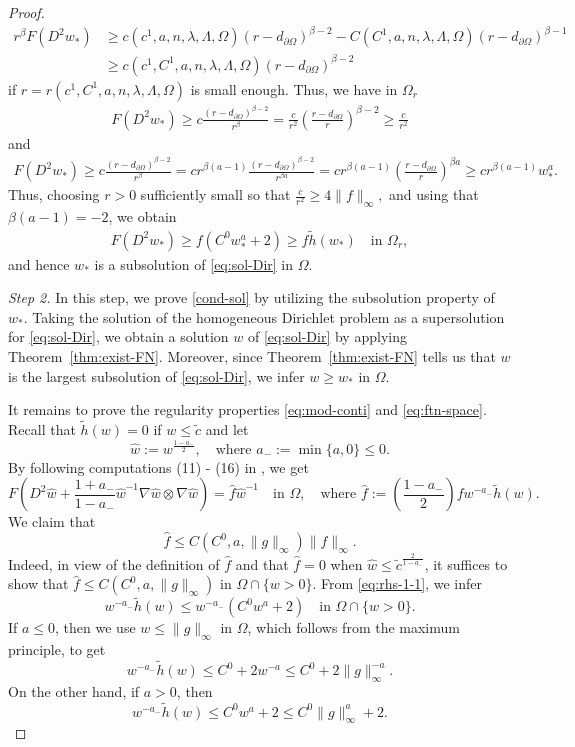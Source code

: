 \documentclass[11pt,oneside,english]{amsart}
\newcommand{\be}{\beta}
\newcommand{\la}{\lambda}
\newcommand{\D}{\nabla}
\numberwithin{equation}{section}
\theoremstyle{plain}
\numberwithin{equation}{section}
\begin{document}
\begin{proof}
\begin{align*}
    r^\be F(D^2w_*)&\ge c(c^1,a,n,\la,\Lambda,\Omega)(r-d_{\partial\Omega})^{\be-2}-C(C^1,a,n,\la,\Lambda,\Omega)(r-d_{\partial\Omega})^{\be-1}\\
    &\ge c(c^1,C^1,a,n,\la,\Lambda,\Omega)(r-d_{\partial\Omega})^{\be-2}
\end{align*}
if $r=r(c^1,C^1,a,n,\la,\Lambda,\Omega)$ is small enough. Thus, we have in $\Omega_r$
\begin{align*}
    F(D^2w_*)\ge c\frac{(r-d_{\partial\Omega})^{\be-2}}{r^\be}=\frac{c}{r^2}\left(\frac{r-d_{\partial\Omega}}{r}\right)^{\be-2}\ge\frac{c}{r^2}
\end{align*}
and 
\begin{align*}
    F(D^2w_*)\ge c\frac{(r-d_{\partial\Omega})^{\be-2}}{r^\be}=cr^{\be(a-1)}\frac{(r-d_{\partial\Omega})^{\be-2}}{r^{\be a}}=cr^{\be(a-1)}\left(\frac{r-d_{\partial\Omega}}r\right)^{\be a}\ge cr^{\be(a-1)}w_*^a.
\end{align*}
Thus, 
choosing $r>0$ sufficiently small so that
$\frac{c}{r^2}\ge 4\|f\|_\infty,$
and using that $\beta(a-1)=-2$, we obtain
\begin{align*}
    F(D^2w_*)\ge f(C^0w_*^a+2)\ge f\tilde h(w_*)\quad\text{in }\Omega_r,
\end{align*} 
and hence  $w_*$ is a subsolution of \eqref{eq:sol-Dir} in $\Omega$.

\medskip\noindent\emph{Step 2.} In this step, we prove \ref{cond-sol} by utilizing the subsolution property of $w_*$. Taking the solution of the homogeneous Dirichlet problem as a supersolution for \eqref{eq:sol-Dir}, we obtain a solution $w$ of \eqref{eq:sol-Dir} by applying Theorem~\ref{thm:exist-FN}. Moreover, since Theorem~\ref{thm:exist-FN} tells us that $w$ is the largest subsolution of \eqref{eq:sol-Dir}, we infer $w\ge  w_*$ in $\Omega$.

It remains to prove the regularity properties \eqref{eq:mod-conti} and \eqref{eq:ftn-space}. Recall that $\tilde h(w)=0$ if $w\le\tilde c$ and let
$$
\hat w:=w^{\frac{1-a_-}2},\quad \text{where }a_-:=\min\{a,0\}\le0.
$$
By following computations (11) - (16) in \cite{AraTei13}, we get
$$
F\left(D^2\hat w+\frac{1+a_-}{1-a_-}\hat w^{-1}\D\hat w\otimes\D\hat w \right)=\hat f\hat w^{-1}\quad\text{in }\Omega,\quad\text{where } \hat f:=\left(\frac{1-a_-}2\right)fw^{-a_-}\tilde h(w).
$$
We claim that
$$
\hat f\le C(C^0,a,\|g\|_\infty)\|f\|_\infty.
$$
Indeed, in view of the definition of $\hat f$ and that $\hat f=0$ when $\hat w\le \tilde c^{\frac2{1-a_-} }$, it suffices to show that $\hat f\le C(C^0,a,\|g\|_\infty)$ in $\Omega\cap\{w>0\}$. From \eqref{eq:rhs-1-1}, we infer
$$
w^{-a_-}\tilde h(w)\le w^{-a_-}(C^0w^a+2) \quad\text{in }\Omega\cap\{w>0\}.
$$
If $a\le 0$, then we use $w\le \|g\|_\infty$ in $\Omega$, which follows from the maximum principle, to get
$$
w^{-a_-}\tilde h(w)\le C^0+2w^{-a}\le C^0+2\|g\|_\infty^{-a}.
$$
On the other hand, if $a>0$, then 
$$
w^{-a_{-}}\tilde h(w)\le C^0w^a+2\le C^0\|g\|_\infty^a+2.
$$


\end{proof}
\end{document}
